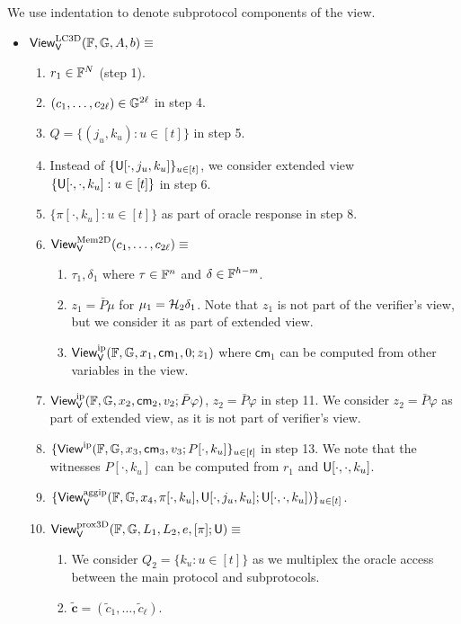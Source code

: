 	


We use indentation to denote subprotocol components of
the view.
\begin{itemize}
\item $\mathsf{View}^{\rm LC3D}_{\mathsf{V}}(\mathbb{F},\mathbb{G},A,b) \equiv$
\begin{enumerate}[{\rm 1.}]
\item $r_1\in \mathbb{F}^N$ (step 1).
\item $(c_1,\ldots,c_{2\ell})\in \mathbb{G}^{2\ell}$ in step 4.
\item $Q=\{(j_u,k_u):u\in [t]\}$ in step 5.
\item Instead of $\{\mathsf{U}[\cdot,j_u,k_u]\}_{u\in [t]}$, we consider extended
view $\{\mathsf{U}[\cdot,\cdot,k_u]: u\in [t]\}$ in step 6.
\item $\{\pi[\cdot,k_u]:u\in [t]\}$ as part of oracle response in step 8.
\item $\mathsf{View}^{\rm Mem2D}_{\mathsf{V}}(c_1,\ldots,c_{2\ell})\equiv$
	\begin{enumerate}[{\rm 1.}]
	\item $\tau_1,\delta_1$ where $\tau\in \mathbb{F}^n$ and $\delta\in \mathbb{F}^{h-m}$.
	\item $z_1=\bar{P}\mu$ for $\mu_1=\mathcal{H}_2\delta_1$. Note that $z_1$ is not part
of the verifier's view, but we consider it as part of extended view.
	\item $\mathsf{View}^{\rm ip}_{\mathsf{V}}(\mathbb{F},\mathbb{G},x_1,\mathsf{cm}_1,0;z_1)$ where
$\mathsf{cm}_1$ can be computed from other variables in the view.
	\end{enumerate}
\item $\mathsf{View}^{\rm ip}_{\mathsf{V}}(\mathbb{F},\mathbb{G},x_2,\mathsf{cm}_2,v_2;\bar{P}\varphi)$,
$z_2=\bar{P}\varphi$ in step 11. We consider $z_2=\bar{P}\varphi$ as part of extended view, as
it is not part of verifier's view.
\item $\{\mathsf{View}^{\rm ip}(\mathbb{F},\mathbb{G},x_3,\mathsf{cm}_3,v_3;P[\cdot,k_u]\}_{u\in
[t]}$ in step 13. We note that the witnesses $P[\cdot,k_u]$ can be computed from
$r_1$ and
$\mathsf{U}[\cdot,\cdot,k_u]$.
\item $\{\mathsf{View}^{\rm
aggip}_{\mathsf{V}}(\mathbb{F},\mathbb{G},x_4,\pi[\cdot,k_u],\mathsf{U}[\cdot,j_u,k_u];\mathsf{U}[\cdot,\cdot,k_u])\}_{u\in
[t]}$.
\item $\mathsf{View}^{\rm prox3D}_{\mathsf{V}}(\mathbb{F},\mathbb{G},L_1,L_2,e,[\pi];\mathsf{U})\equiv$
	\begin{enumerate}[{\rm 1.}]
	\item We consider $Q_2 = \{k_u:u\in [t]\}$ as we multiplex the oracle
access between the main protocol and subprotocols.
	\item $\tilde{\bm{c}} = (\tilde{c}_1,\ldots,\tilde{c}_\ell)$.
	\end{enumerate}

\end{enumerate}
\end{itemize}



